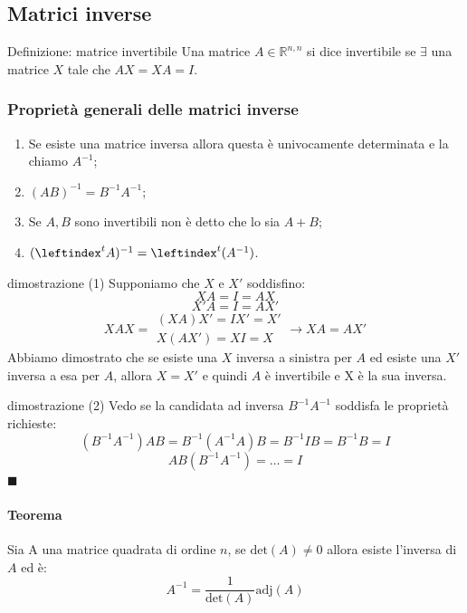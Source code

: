 \documentclass[x11names]{article}
\newcommand*{\QEDA}{\null\nobreak\hfill\ensuremath{\blacksquare}}%
\begin{document}
\subsection{Matrici inverse}
\begin{center}
\colorbox{myblue}{\begin{minipage}{5.75in}
\begin{blues}{Definizione: matrice invertibile}
    Una matrice $A \in \mathbb{R}^{n,n}$ si dice invertibile se $\exists$ una matrice $X$ tale che $AX = XA = I$.
\end{blues}
\end{minipage}}        
\end{center}
\subsubsection*{Proprietà generali delle matrici inverse}
\begin{enumerate}
    \item Se esiste una matrice inversa allora questa è univocamente determinata e la chiamo $A^{-1}$;
    \item $(AB)^{-1} = B^{-1}A^{-1}$;
    \item Se $A,B$ sono invertibili non è detto che lo sia $A+B$;
    \item $(\leftindex ^t{A})^{-1} = \leftindex ^t(A^{-1})$.
\end{enumerate}



\begin{es}{dimostrazione (1)}
Supponiamo che $X$ e $X'$ soddisfino:
$$
XA = I = AX 
$$
$$
X' A = I = AX'
$$
$$
XAX = \begin{array}{c}
       (XA)X' = IX' = X' \\
       X(AX') = XI = X
    \end{array}
    \rightarrow
    XA = AX'
$$
Abbiamo dimostrato che se esiste una $X$ inversa a sinistra per $A$ ed esiste una $X' $ inversa a esa per $A$, allora $X=X'$ e quindi $A$ è invertibile e X è la sua inversa.
\end{es}
\begin{es}{dimostrazione (2)}
Vedo se la candidata ad inversa $B^{-1}A^{-1}$ soddisfa le proprietà richieste:
$$
(B^{-1}A^{-1})AB = B^{-1}(A^{-1}A)B = B^{-1}IB = B^{-1}B = I
$$
$$
AB(B^{-1}A^{-1})= \dots = I
$$
\QEDA
\end{es}



\begin{center}
\colorbox{Bisque1}{\begin{minipage}{5.75in}
\paragraph{Teorema} 
Sia A una matrice quadrata di ordine $n$, se $\text{det}(A) \neq 0$ allora esiste l’inversa di $A$ ed è:
$$
A^{-1} = \frac{1}{\text{det}(A)}\text{adj}(A)
$$
\end{minipage}}        
\end{center}
\end{document}
